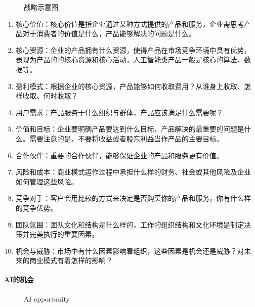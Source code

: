 \documentclass[letterpaper,11pt,english]{sphinxmanual}
\begin{document}
\begin{figure}[H]
\centering
\capstart

\noindent{}
\caption{战略示意图}\label{\detokenize{chapter_introduction/opportunity:id13}}\end{figure}
\begin{enumerate}
%
\item {} 
核心价值：核心价值是指企业通过某种方式提供的产品和服务，企业需思考产品对于消费者的价值是什么，产品能够解决的问题是什么。

\item {} 
核心资源：企业的产品拥有什么资源，使得产品在市场竞争环境中具有优势，表现为产品的的核心资源和核心活动，人工智能类产品一般是核心的算法、数据等。

\item {} 
盈利模式：根据企业的核心资源，产品能够如何收取费用？从谁身上收取、怎样收取、何时收取？

\item {} 
用户需求：产品服务于什么组织与群体，产品应该满足什么需要呢？

\item {} 
价值和目标：企业要明确产品要达到什么目标，产品解决的最重要的问题是什么。需要注意的是，不要将收益或者股东利益当作产品的主要目标。

\item {} 
合作伙伴：重要的合作伙伴，能够保证企业的产品和服务更有价值。

\item {} 
风险和成本：商业模式运作过程中承担什么样的财务、社会或其他风险及企业如何管理这些风险。

\item {} 
竞争对手：客户会用比较的方式来决定是否购买你的产品和服务，你有什么样的竞争优势。

\item {} 
团队氛围：团队文化和结构是什么样的，工作的组织结构和文化环境是制定决策并完美执行的重要因素。

\item {} 
机会与威胁：市场中有什么因素影响着组织，这些因素是机会还是威胁？对未来的商业模式有着怎样的影响？

\end{enumerate}


\paragraph{AI的机会}
\label{\detokenize{chapter_introduction/opportunity:ai}}
\begin{figure}[H]
\centering
\capstart

\noindent{}
\caption{AI opportunity}\label{\detokenize{chapter_introduction/opportunity:id14}}\end{figure}
\end{document}
